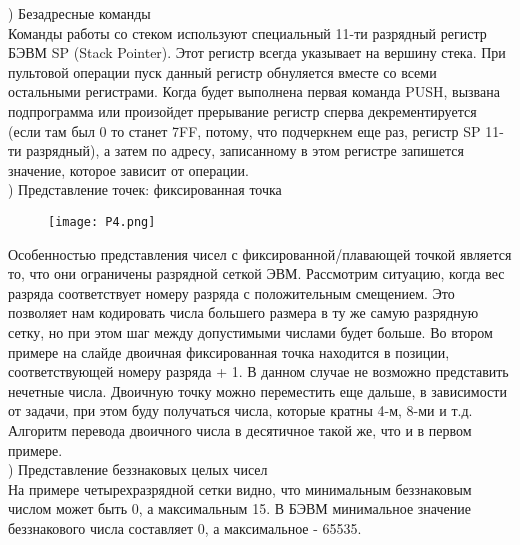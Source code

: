) Безадресные команды \\
Команды работы со стеком используют специальный 11-ти разрядный регистр БЭВМ SP (Stack Pointer). Этот регистр всегда указывает на вершину стека. При пультовой операции пуск данный регистр обнуляется вместе со всеми остальными регистрами. Когда будет выполнена первая команда PUSH, вызвана подпрограмма или произойдет прерывание регистр сперва декрементируется (если там был 0 то станет 7FF, потому, что подчеркнем еще раз, регистр SP 11-ти разрядный), а затем по адресу, записанному в этом регистре запишется значение, которое зависит от операции. \\

) Представление точек: фиксированная точка \\
\begin{figure}[H]
    \centering
    \texttt{[image: P4.png]}
\end{figure}
\noindent Особенностью представления чисел с фиксированной/плавающей точкой является то, что они ограничены разрядной сеткой ЭВМ.  Рассмотрим ситуацию, когда вес разряда соответствует номеру разряда с положительным смещением. Это позволяет нам кодировать числа большего размера в ту же самую разрядную сетку, но при этом шаг между допустимыми числами будет больше. Во втором примере на слайде двоичная фиксированная точка находится в позиции, соответствующей номеру разряда + 1. В данном случае не возможно представить нечетные числа. Двоичную точку можно переместить еще дальше, в зависимости от задачи, при этом буду получаться числа, которые кратны 4-м, 8-ми и т.д. Алгоритм перевода двоичного числа в десятичное такой же, что и в первом примере. \\

) Представление беззнаковых целых чисел \\
На примере четырехразрядной сетки видно, что минимальным беззнаковым числом может быть 0, а максимальным 15. В БЭВМ минимальное значение беззнакового числа составляет 0, а максимальное - 65535. \\

